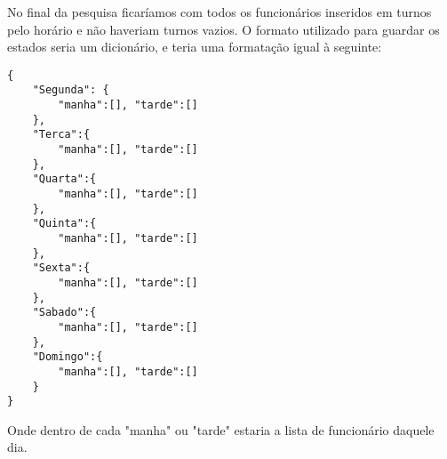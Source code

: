  No final da pesquisa ficaríamos com todos os funcionários inseridos em turnos pelo horário e não haveriam turnos vazios.
 \clearpage
 O formato utilizado para guardar os estados seria um dicionário, e teria uma formatação igual à seguinte:
 
 
\begin{lstlisting}
{
    "Segunda": {
        "manha":[], "tarde":[]              
    },
    "Terca":{
        "manha":[], "tarde":[]
    },
    "Quarta":{
        "manha":[], "tarde":[]
    },
    "Quinta":{
        "manha":[], "tarde":[]
    },
    "Sexta":{
        "manha":[], "tarde":[]
    },
    "Sabado":{
        "manha":[], "tarde":[]
    },
    "Domingo":{
        "manha":[], "tarde":[]
    }
}
\end{lstlisting}

\noindent Onde dentro de cada "manha" ou "tarde" estaria a lista de funcionário daquele dia.